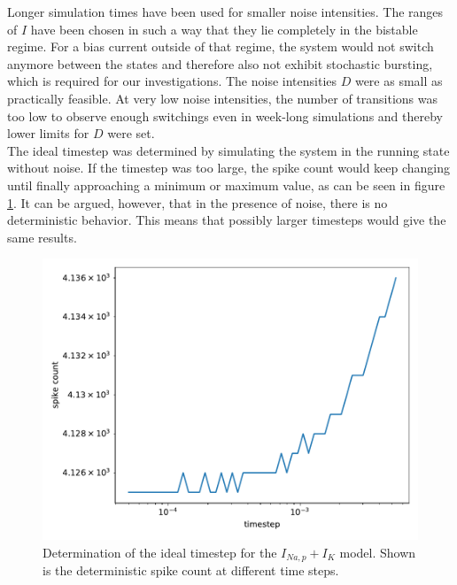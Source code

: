 \documentclass[12pt,a4paper]{article}
\begin{document}
Longer simulation times have been used for smaller noise intensities. The ranges of $I$ have been chosen in such a way that they lie completely in the bistable regime. For a bias current outside of that regime, the system would not switch anymore between the states and therefore also not exhibit stochastic bursting, which is required for our investigations. The noise intensities $D$ were as small as practically feasible. At very low noise intensities, the number of transitions was too low to observe enough switchings even in week-long simulations and thereby lower limits for $D$ were set.\\The ideal timestep was determined by simulating the system in the running state without noise. If the timestep was too large, the spike count would keep changing until finally approaching a minimum or maximum value, as can be seen in figure \ref{dtanhopf}. It can be argued, however, that in the presence of noise, there is no deterministic behavior. This means that possibly larger timesteps would give the same results.
\begin{figure}[H]
	\centering
	\includegraphics[scale=0.5]{detmotimeanhopf4.pdf}\caption{Determination of the ideal timestep for the $I_{Na,p}+I_K$ model. Shown is the deterministic spike count at different time steps.}
	\label{dtanhopf}
\end{figure}
\end{document}
